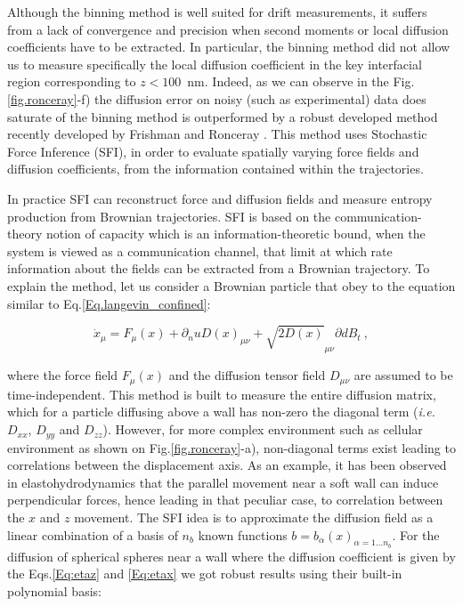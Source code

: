 Although the binning method is well suited for drift measurements, it suffers from a lack of convergence and precision when second moments or local diffusion coefficients have to be extracted. In particular, the binning method did not allow us to measure specifically the local diffusion coefficient in the key interfacial region corresponding to $z<100$~nm. Indeed, as we can observe in the Fig.\ref{fig.ronceray}-f) the diffusion error on noisy (such as experimental) data does saturate of the binning method is outperformed by a robust developed method  recently developed by Frishman and Ronceray \cite{frishman_learning_2020}. This method uses Stochastic Force Inference (\gls{SFI}), in order to evaluate spatially varying force fields and diffusion coefficients, from the information contained within the trajectories. 

In practice \gls{SFI} can reconstruct force and diffusion fields and measure entropy production from Brownian trajectories. \gls{SFI} is based on the communication-theory notion of capacity which is an information-theoretic bound, when the system is viewed as a communication channel, that limit at which rate information about the fields can be extracted from a Brownian trajectory. To explain the method, let us consider a Brownian particle that obey to the equation similar to Eq.\ref{Eq.langevin_confined}:

\begin{equation}
	\dot{x}_\mu = F_\mu (x) + \partial_nu D(x)_{\mu \nu} + \sqrt{2D(x)}_{\mu \nu} \partial{d}B_t~,
\end{equation}

where  the force field $F_\mu (x)$ and the diffusion tensor field $D_{\mu \nu}$ are assumed to be time-independent. This method is built to measure the entire diffusion matrix, which for a particle diffusing above a wall has non-zero the diagonal term (\textit{i.e.} $D_{xx}$, $D_{yy}$ and $D_{zz}$). However, for more complex environment such as cellular environment as shown on Fig.\ref{fig.ronceray}-a), non-diagonal terms exist leading to correlations between the displacement axis. As an example, it has been observed in elastohydrodynamics \cite{saintyves_self-sustained_2016} that the parallel movement near a soft wall can induce perpendicular forces, hence leading in that peculiar case, to correlation between the $x$ and $z$ movement. The \gls{SFI} idea is to approximate the diffusion field as a linear combination of a basis of $n_b$ known functions $b={b_\alpha (x)}_{\alpha = 1...n_b}$. For the diffusion of spherical spheres near a wall where the diffusion coefficient is given by the Eqs.\ref{Eq:etaz} and \ref{Eq:etax} we got robust results using their built-in polynomial basis:

